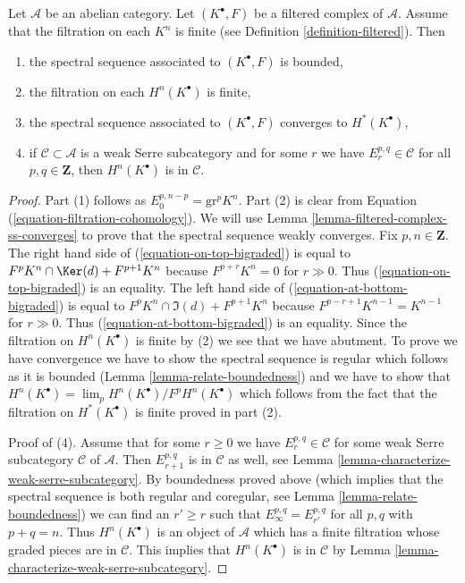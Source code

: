 \begin{lemma}
\label{lemma-biregular-ss-converges}
Let $\mathcal{A}$ be an abelian category. Let $(K^\bullet, F)$ be a
filtered complex of $\mathcal{A}$. Assume that the filtration on each $K^n$
is finite (see Definition \ref{definition-filtered}). Then
\begin{enumerate}
\item the spectral sequence associated to $(K^\bullet, F)$ is bounded,
\item the filtration on each $H^n(K^\bullet)$ is finite,
\item the spectral sequence associated to $(K^\bullet, F)$ converges
to $H^*(K^\bullet)$,
\item if $\mathcal{C} \subset \mathcal{A}$ is a weak Serre subcategory
and for some $r$ we have $E_r^{p, q} \in \mathcal{C}$ for all
$p, q \in \mathbf{Z}$, then $H^n(K^\bullet)$ is in $\mathcal{C}$.
\end{enumerate}
\end{lemma}

\begin{proof}
Part (1) follows as $E_0^{p, n - p} = \text{gr}^p K^n$.
Part (2) is clear from Equation (\ref{equation-filtration-cohomology}).
We will use Lemma \ref{lemma-filtered-complex-ss-converges} to prove
that the spectral sequence weakly converges. Fix $p, n \in \mathbf{Z}$.
The right hand side of (\ref{equation-on-top-bigraded})
is equal to $F^pK^n \cap \Ker(d) + F^{p + 1}K^n$ because
$F^{p + r}K^n = 0$ for $r \gg 0$. Thus (\ref{equation-on-top-bigraded})
is an equality. The left hand side of (\ref{equation-at-bottom-bigraded})
is equal to $F^pK^n \cap \Im(d) + F^{p + 1}K^n$ because
$F^{p - r + 1}K^{n - 1} = K^{n - 1}$ for $r \gg 0$.
Thus (\ref{equation-at-bottom-bigraded}) is an equality. Since the filtration
on $H^n(K^\bullet)$ is finite by (2) we see that we have abutment.
To prove we have convergence we have to show the spectral sequence is
regular which follows as it is bounded
(Lemma \ref{lemma-relate-boundedness}) and we have
to show that $H^n(K^\bullet) = \lim_p H^n(K^\bullet)/F^pH^n(K^\bullet)$
which follows from the fact that the filtration on $H^*(K^\bullet)$
is finite proved in part (2).

\medskip\noindent
Proof of (4). Assume that for some $r \geq 0$ we have
$E_r^{p, q} \in \mathcal{C}$ for some weak Serre subcategory
$\mathcal{C}$ of $\mathcal{A}$. Then $E_{r + 1}^{p, q}$ is
in $\mathcal{C}$ as well, see
Lemma \ref{lemma-characterize-weak-serre-subcategory}.
By boundedness proved above (which implies that the spectral sequence
is both regular and coregular, see Lemma \ref{lemma-relate-boundedness})
we can find an $r' \geq r$ such that $E_\infty^{p, q} = E_{r'}^{p, q}$
for all $p, q$ with $p + q = n$. Thus $H^n(K^\bullet)$ is an object
of $\mathcal{A}$ which has a finite filtration whose graded pieces
are in $\mathcal{C}$. This implies that $H^n(K^\bullet)$ is in $\mathcal{C}$
by Lemma \ref{lemma-characterize-weak-serre-subcategory}.
\end{proof}

